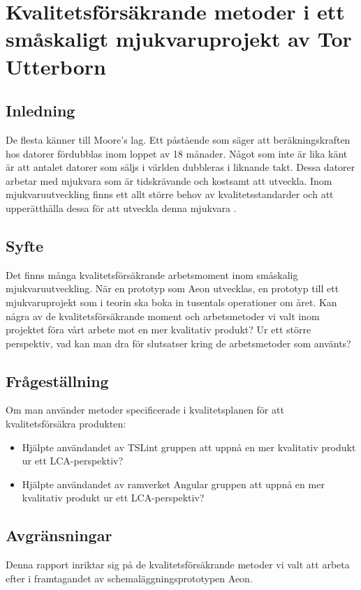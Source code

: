 \chapter{Kvalitetsförsäkrande metoder i ett småskaligt mjukvaruprojekt av Tor Utterborn}

\section{Inledning}

De flesta känner till Moore's lag. Ett påstående som säger att beräkningskraften hos datorer fördubblas inom loppet av 18 månader. 
Något som inte är lika känt är att antalet datorer som säljs i världen dubbleras i liknande takt. \cite{greenbiz}
Dessa datorer arbetar med mjukvara som är tidskrävande och kostsamt att utveckla. Inom mjukvaruutveckling finns ett allt större behov av kvalitetsstandarder och att upperätthålla dessa för att utveckla denna mjukvara \cite{linkedin}.

\section{Syfte}

Det finns många kvalitetsförsäkrande arbetsmoment inom småskalig mjukvaruutveckling. När en prototyp som Aeon utvecklas, en prototyp till ett mjukvaruprojekt som i teorin ska boka in tusentals operationer om året. Kan några av de kvalitetsförsäkrande moment och arbetsmetoder vi valt inom projektet föra vårt arbete mot en mer kvalitativ produkt? Ur ett större perspektiv, vad kan man dra för slutsatser kring de arbetsmetoder som använts?

\section{Frågeställning}

Om man använder metoder specificerade i kvalitetsplanen för att kvalitetsförsäkra produkten: 
\begin{itemize}
	\item Hjälpte användandet av TSLint gruppen att uppnå en mer kvalitativ produkt ur ett LCA-perspektiv?
	\item Hjälpte användandet av ramverket Angular gruppen att uppnå en mer kvalitativ produkt ur ett LCA-perspektiv?
\end{itemize}

\section{Avgränsningar}
Denna rapport inriktar sig på de kvalitetsförsäkrande metoder vi valt att arbeta efter i framtagandet av schemaläggningsprototypen Aeon.

